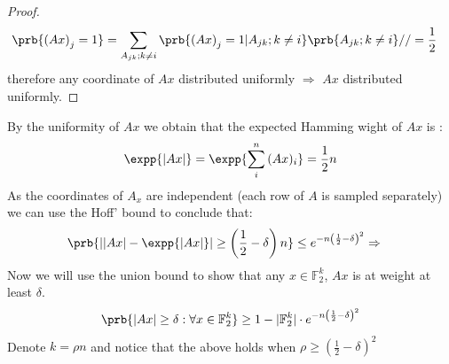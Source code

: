 \documentclass{article}
\newcommand{\FF}{\mathbb{F}}
\begin{document}
\begin{multicols*}{2}
\begin{proof}
  \begin{equation*}
    \begin{split}
      \prb{\left( Ax \right)_{j} = 1} &=  \sum_{ A_{jk}; k\neq i   }{\prb{\left( Ax \right)_{j} = 1 | A_{jk} ; k\neq i }\prb{ A_{jk} ; k\neq i }}  // 
      = \frac{1}{2} 
    \end{split}
  \end{equation*}
  therefore any coordinate of $Ax$ distributed uniformly $\Rightarrow$ $Ax$ distributed uniformly. 
  \end{proof}
By the uniformity of $Ax$ we obtain that the expected Hamming wight of $Ax$ is : 
\begin{equation*}
  \begin{split}
    \expp{|Ax| } = \expp{\sum_{i}^{n}{(Ax)_{i}}} = \frac{1}{2} n    
  \end{split}
\end{equation*} As the coordinates of $A_{x}$ are independent (each row of $A$ is sampled separately) we can use the Hoff' bound to conclude that: 
\begin{equation*}
  \begin{split}
    \prb{| |Ax| - \expp{|Ax|}| \ge \left(\frac{1}{2} - \delta \right) n } & \le e^{-n \left(\frac{1}{2} - \delta \right)^{2} } 
    \Rightarrow
  \end{split}
\end{equation*}
Now we will use the union bound to show that any $x\in \FF_{2}^{k}$, $Ax$ is at weight at least $\delta$.  
\begin{equation*}
  \begin{split}
    \prb{|Ax| \ge \delta : \forall x \in \FF_{2}^{k} } \ge 1 - |\FF_{2}^{k}| \cdot e^{-n \left(\frac{1}{2} - \delta \right)^{2} } 
  \end{split}
\end{equation*}
Denote $k = \rho n$ and notice that the above holds when $\rho \ge \left(\frac{1}{2} - \delta \right)^{2} $  

\end{multicols*}
\end{document}

